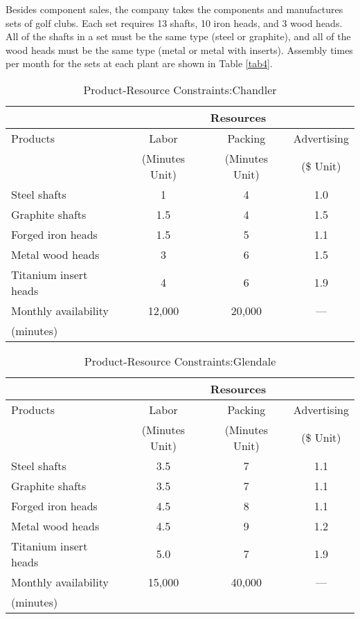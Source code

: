 \documentclass[12pt]{article}
\begin{document}
	\noindent Besides component sales, the company takes the components and manufactures sets of golf clubs. Each set requires 13 shafts, 10 iron heads, and 3 wood heads. All of the shafts in a set must be the same type (steel or graphite), and all of the wood heads must be the same type (metal or metal with inserts). Assembly times per month for the sets at each plant are shown in Table \ref{tab4}.
	\begin{table}[H]
		\centering
		\setlength{\belowcaptionskip}{0.1cm} 
		\caption{Product-Resource Constraints:Chandler}
		\label{tab1}
		\begin{tabular}{lccc}
			\hline
			\hline
		 & \multicolumn{3}{c}{Resources} \\
		 \hline
		Products&Labor  &  Packing   &    Advertising     \\
		&(Minutes Unit)&(Minutes Unit)&(\$ Unit) \\
		Steel shafts& 1&4&1.0  \\
		Graphite shafts& 1.5&4&1.5\\
		Forged iron heads&1.5&5&1.1\\
		Metal wood heads&3&6&1.5\\
		Titanium insert heads&4&6&1.9\\
		\hline
		Monthly availability&12,000&20,000&---\\
		(minutes)&&&\\
		\hline
		\hline  
		\end{tabular}
		\end{table}

		\begin{table}[H]
			\centering
			\setlength{\belowcaptionskip}{0.1cm} 
			\caption{Product-Resource Constraints:Glendale}
			\label{tab2}
			\begin{tabular}{lccc}
				\hline
				\hline
			 & \multicolumn{3}{c}{Resources} \\
			 \hline
			Products&Labor  &  Packing   &    Advertising     \\
			&(Minutes Unit)&(Minutes Unit)&(\$ Unit) \\
			Steel shafts& 3.5&7&1.1  \\
			Graphite shafts& 3.5&7&1.1\\
			Forged iron heads&4.5&8&1.1\\
			Metal wood heads&4.5&9&1.2\\
			Titanium insert heads&5.0&7&1.9\\
			\hline
			Monthly availability&15,000&40,000&---\\
			(minutes)&&&\\
			\hline
			\hline  
			\end{tabular}
			\end{table}
\end{document}
